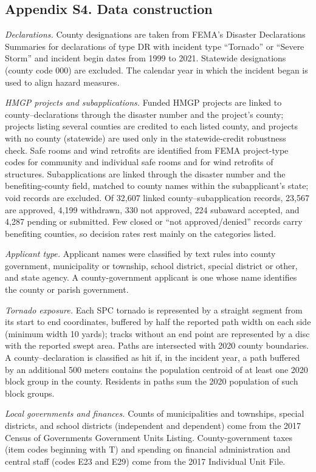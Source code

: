 \subsection*{Appendix S4. Data construction}

\textit{Declarations.} County designations are taken from FEMA's Disaster Declarations Summaries for declarations of type DR with incident type ``Tornado'' or ``Severe Storm'' and incident begin dates from 1999 to 2021. Statewide designations (county code 000) are excluded. The calendar year in which the incident began is used to align hazard measures.

\textit{HMGP projects and subapplications.} Funded HMGP projects are linked to county--declarations through the disaster number and the project's county; projects listing several counties are credited to each listed county, and projects with no county (statewide) are used only in the statewide-credit robustness check. Safe rooms and wind retrofits are identified from FEMA project-type codes for community and individual safe rooms and for wind retrofits of structures. Subapplications are linked through the disaster number and the benefiting-county field, matched to county names within the subapplicant's state; void records are excluded. Of 32,607 linked county--subapplication records, 23,567 are approved, 4,199 withdrawn, 330 not approved, 224 subaward accepted, and 4,287 pending or submitted. Few closed or ``not approved/denied'' records carry benefiting counties, so decision rates rest mainly on the categories listed.

\textit{Applicant type.} Applicant names were classified by text rules into county government, municipality or township, school district, special district or other, and state agency. A county-government applicant is one whose name identifies the county or parish government.

\textit{Tornado exposure.} Each SPC tornado is represented by a straight segment from its start to end coordinates, buffered by half the reported path width on each side (minimum width 10 yards); tracks without an end point are represented by a disc with the reported swept area. Paths are intersected with 2020 county boundaries. A county--declaration is classified as hit if, in the incident year, a path buffered by an additional 500 meters contains the population centroid of at least one 2020 block group in the county. Residents in paths sum the 2020 population of such block groups.

\textit{Local governments and finances.} Counts of municipalities and townships, special districts, and school districts (independent and dependent) come from the 2017 Census of Governments Government Units Listing. County-government taxes (item codes beginning with T) and spending on financial administration and central staff (codes E23 and E29) come from the 2017 Individual Unit File.

